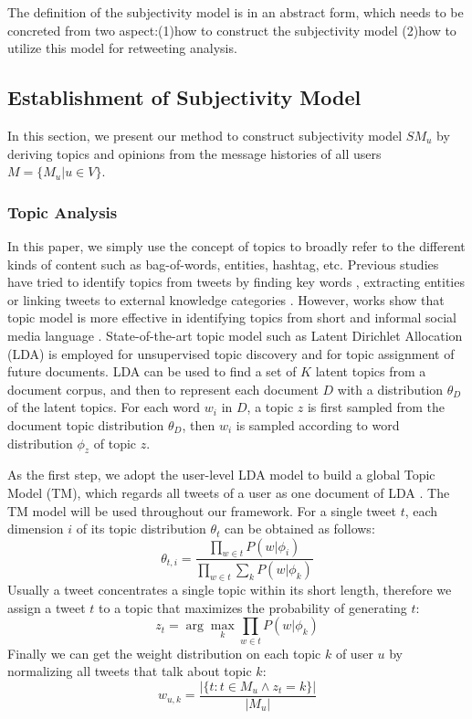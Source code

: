 \documentclass[letterpaper]{article}
\begin{document}
The definition of the subjectivity model is in an abstract form, which needs to be concreted from two aspect:(1)how to construct the subjectivity model (2)how to utilize this model for retweeting analysis.
 
\subsection{Establishment of Subjectivity Model}
\label{establishment}

In this section, we present our method to construct subjectivity model $ SM_{u }$ by deriving topics and opinions from the message histories of all users $ M=\lbrace M_{u}\vert u \in V\rbrace$.

\subsubsection{Topic Analysis}
\label{topic}

In this paper, we simply use the concept of topics to broadly refer to the different kinds of content such as bag-of-words, entities, hashtag, etc. Previous studies have tried to identify topics from tweets by finding key words \cite{chen2010short}, extracting  entities \cite{abel2011analyzing} or linking tweets to external knowledge categories \cite{macskassy2011people}. However, works show that topic model is more effective in identifying topics from short and informal social media language \cite{hong2010empirical}. State-of-the-art topic model such as Latent Dirichlet Allocation (LDA) \cite{blei2003latent} is employed for unsupervised topic discovery and for topic assignment of future documents. LDA can be used to find a set of $ K $ latent topics from a document corpus, and then to represent each document $ D $ with a distribution $ \theta_{D} $ of the latent topics. For each word $ w_{i} $ in $ D $, a topic $ z $ is first sampled from the document topic distribution $ \theta_{D} $, then $ w_{i} $ is sampled according to word distribution $ \phi_{z} $ of topic $ z $. 

As the first step, we adopt the user-level LDA model to build a global Topic Model (TM), which regards all tweets of a user as one document of LDA \cite{hong2010empirical}. The TM model will be used throughout our framework. For a single tweet $ t $, each dimension $ i $ of its topic distribution $ \theta_{t} $ can be obtained as follows:
\begin{equation}
\theta_{t,i}=\dfrac{\prod_{w \in t}P(w|\phi_{i})}{\prod_{w \in t}\sum_{k}P(w|\phi_{k})}
\end{equation}
Usually a tweet concentrates a single topic within its short length, therefore we assign a tweet $ t $ to a topic that maximizes the probability of generating $ t $:
\begin{equation}
\label{twtopic}
z_{t} = \arg \max_{k}\prod_{w \in t} P(w|\phi_{k})
\end{equation}
Finally we can get the weight distribution on each topic $ k $ of user $ u $ by normalizing all tweets that talk about topic $ k $: 
\begin{equation}
w_{u,k}=\dfrac{|\{ t: t \in M_{u} \wedge z_{t}=k\}|}{|M_{u}|}
\end{equation}
\end{document}
